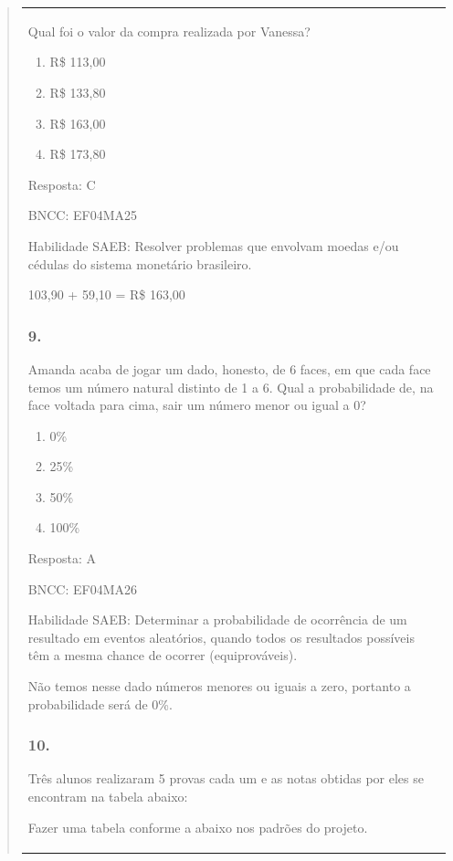 \begin{enumerate}
\begin{escolha}
\begin{enumerate}
\begin{itemize}
\begin{itemize}
\begin{escolha}
\begin{quote}
\begin{escolha}
{\begin{longtable}[]{@{}l@{}}
\begin{itemize}
Qual foi o valor da compra realizada por Vanessa?

\begin{enumerate}
\def\labelenumi{\alph{enumi})}
\item
  R\$ 113,00
\item
  R\$ 133,80
\item
  R\$ 163,00
\item
  R\$ 173,80
\end{enumerate}

Resposta: C

BNCC: EF04MA25

Habilidade SAEB: Resolver problemas que envolvam moedas e/ou cédulas do
sistema monetário brasileiro.

103,90 + 59,10 = R\$ 163,00

\subsubsection{9.}\label{section-165}

Amanda acaba de jogar um dado, honesto, de 6 faces, em que cada face
temos um número natural distinto de 1 a 6. Qual a probabilidade de, na
face voltada para cima, sair um número menor ou igual a 0?

\begin{enumerate}
\def\labelenumi{\alph{enumi})}
\item
  0\%
\item
  25\%
\item
  50\%
\item
  100\%
\end{enumerate}

Resposta: A

BNCC: EF04MA26

Habilidade SAEB: Determinar a probabilidade de ocorrência de um
resultado em eventos aleatórios, quando todos os resultados possíveis
têm a mesma chance de ocorrer (equiprováveis).

Não temos nesse dado números menores ou iguais a zero, portanto a
probabilidade será de 0\%.

\subsubsection{10.}\label{section-166}

Três alunos realizaram 5 provas cada um e as notas obtidas por eles se
encontram na tabela abaixo:

Fazer uma tabela conforme a abaixo nos padrões do projeto.


\end{itemize}
\end{longtable}}
\end{escolha}
\end{quote}
\end{escolha}
\end{itemize}
\end{itemize}
\end{enumerate}
\end{escolha}
\end{enumerate}
